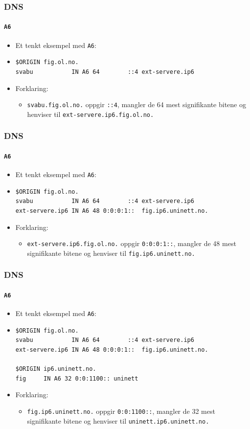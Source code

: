 \begin{frame}[fragile]%
  \frametitle{DNS}
  \framesubtitle{\texttt{A6}}
  \begin{itemize}%
  \item Et tenkt eksempel med \texttt{A6}:
  \item 
\begin{verbatim}
$ORIGIN fig.ol.no.
svabu           IN A6 64        ::4 ext-servere.ip6
\end{verbatim}
  \item Forklaring:
    \begin{itemize}%
    \item \texttt{svabu.fig.ol.no.} oppgir \texttt{::4}, mangler de 64
      mest signifikante bitene og henviser til
      \texttt{ext-servere.ip6.fig.ol.no.}
    \end{itemize}
  \end{itemize}
\end{frame}

\begin{frame}[fragile]%
  \frametitle{DNS}
  \framesubtitle{\texttt{A6}}
  \begin{itemize}%
  \item Et tenkt eksempel med \texttt{A6}:
  \item 
\begin{verbatim}
$ORIGIN fig.ol.no.
svabu           IN A6 64        ::4 ext-servere.ip6
ext-servere.ip6 IN A6 48 0:0:0:1::  fig.ip6.uninett.no.
\end{verbatim}
  \item Forklaring:
    \begin{itemize}%
    \item \texttt{ext-servere.ip6.fig.ol.no.} oppgir
      \texttt{0:0:0:1::}, mangler de 48 mest signifikante bitene og
      henviser til \texttt{fig.ip6.uninett.no.}
    \end{itemize}
  \end{itemize}
\end{frame}

\begin{frame}[fragile]%
  \frametitle{DNS}
  \framesubtitle{\texttt{A6}}
  \begin{itemize}%
  \item Et tenkt eksempel med \texttt{A6}:
  \item 
\begin{verbatim}
$ORIGIN fig.ol.no.
svabu           IN A6 64        ::4 ext-servere.ip6
ext-servere.ip6 IN A6 48 0:0:0:1::  fig.ip6.uninett.no.

$ORIGIN ip6.uninett.no.
fig     IN A6 32 0:0:1100:: uninett
\end{verbatim}
  \item Forklaring:
    \begin{itemize}%
    \item \texttt{fig.ip6.uninett.no.} oppgir \texttt{0:0:1100::},
      mangler de 32 mest signifikante bitene og henviser til
      \texttt{uninett.ip6.uninett.no.}
    \end{itemize}
  \end{itemize}
\end{frame}

